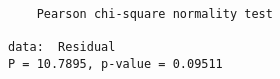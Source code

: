 \begin{verbatim} 

	Pearson chi-square normality test

data:  Residual
P = 10.7895, p-value = 0.09511

\end{verbatim}
